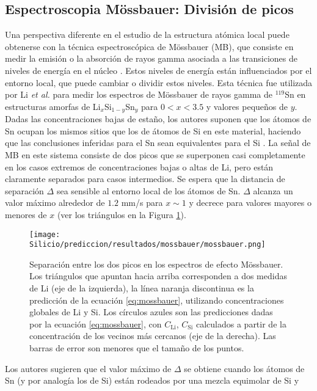 \subsection{Espectroscopia Mössbauer: División de picos}

Una perspectiva diferente en el estudio de la estructura atómica local puede 
obtenerse con la técnica espectroscópica de Mössbauer (MB), que consiste en medir 
la emisión o la absorción de rayos gamma asociada a las transiciones de niveles
de energía en el núcleo \cite{long2013}. Estos niveles de energía están 
influenciados por el entorno local, que puede cambiar o dividir estos niveles.
Esta técnica fue utilizada por Li \textit{et al.} \cite{li2009} para medir los espectros de 
Mössbauer de rayos gamma de $^{119}$Sn en estructuras amorfas de 
Li$_x$Si$_{1-y}$Sn$_y$ para $0 < x < 3.5$ y valores pequeños de $y$.
Dadas las concentraciones bajas de estaño, los autores suponen que los átomos de Sn
ocupan los mismos sitios que los de átomos de Si en este material, haciendo que 
las conclusiones inferidas para el Sn sean equivalentes para el Si 
\cite{hatchard2005}. La señal de MB en este sistema consiste de dos picos que se superponen casi 
completamente en los casos extremos de concentraciones bajas o altas de Li, 
pero están claramente separados para casos intermedios. Se espera que la distancia de separación
$\Delta$ sea sensible al entorno local de los átomos de Sn. $\Delta$
alcanza un valor máximo alrededor de $1.2$ mm/s para $x \sim 1$ y decrece para 
valores mayores o menores de $x$ (ver los triángulos en la Figura \ref{fig:mossbauer}).
\begin{figure}[h!]
    \centering
    \texttt{[image: Silicio/prediccion/resultados/mossbauer/mossbauer.png]}
    \caption{Separación entre los dos picos en los espectros de efecto 
    Mössbauer. Los triángulos que apuntan hacia arriba corresponden a dos 
    medidas de Li  \cite{li2009} (eje de la izquierda), la línea naranja discontinua es la 
    predicción de la ecuación \ref{eq:mossbauer}, utilizando concentraciones 
    globales de Li y Si. Los círculos azules son las predicciones dadas 
    por la ecuación \ref{eq:mossbauer}, con $C_{\text{Li}}$, $C_{\text{Si}}$ 
    calculados a partir de la concentración de los vecinos más cercanos (eje de 
    la derecha). Las barras de error son menores que el tamaño de los puntos.}
    \label{fig:mossbauer}
\end{figure}
Los autores sugieren que el valor máximo de $\Delta$ se obtiene cuando los átomos 
de Sn (y por analogía los de Si) están rodeados por una mezcla equimolar de Si y 
